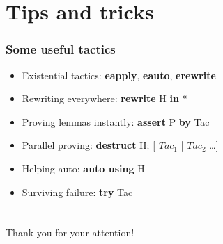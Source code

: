 \documentclass{beamer}
\begin{document}
\section{Tips and tricks}

\begin{frame}
  \frametitle{Some useful tactics}
  \begin{itemize}
    \item Existential tactics: \textbf{eapply}, \textbf{eauto}, \textbf{erewrite}
    \item Rewriting everywhere: \textbf{rewrite} H \textbf{in} *
    \item Proving lemmas instantly: \textbf{assert} P \textbf{by} Tac
    \item Parallel proving: \textbf{destruct} H; [ $Tac_1$ | $Tac_2$ \ldots ]
    \item Helping auto: \textbf{auto using} H
    \item Surviving failure: \textbf{try} Tac
  \end{itemize}
\end{frame}
\section*{}

\begin{frame}[fragile]
  \begin{center}
    Thank you for your attention!
  \end{center}
\end{frame}
\end{document}
